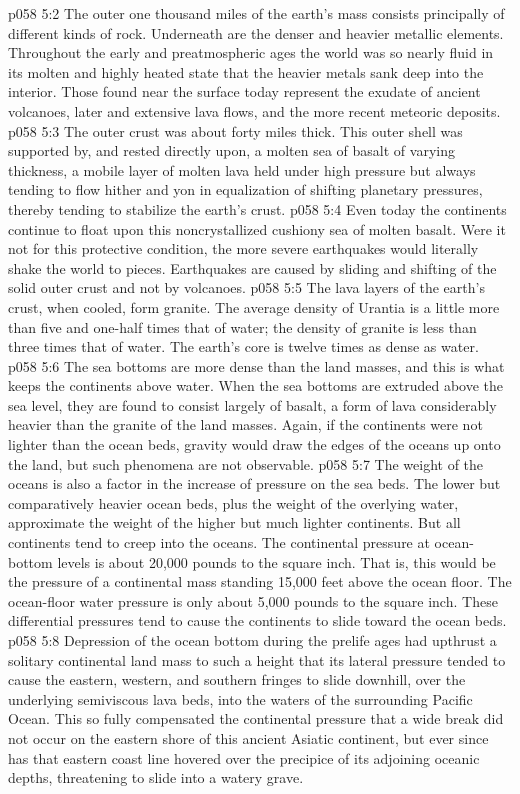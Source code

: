\vs p058 5:2 The outer one thousand miles of the earth’s mass consists principally of different kinds of rock. Underneath are the denser and heavier metallic elements. Throughout the early and preatmospheric ages the world was so nearly fluid in its molten and highly heated state that the heavier metals sank deep into the interior. Those found near the surface today represent the exudate of ancient volcanoes, later and extensive lava flows, and the more recent meteoric deposits.
\vs p058 5:3 The outer crust was about forty miles thick. This outer shell was supported by, and rested directly upon, a molten sea of basalt of varying thickness, a mobile layer of molten lava held under high pressure but always tending to flow hither and yon in equalization of shifting planetary pressures, thereby tending to stabilize the earth’s crust.
\vs p058 5:4 Even today the continents continue to float upon this noncrystallized cushiony sea of molten basalt. Were it not for this protective condition, the more severe earthquakes would literally shake the world to pieces. Earthquakes are caused by sliding and shifting of the solid outer crust and not by volcanoes.
\pc \vs p058 5:5 The lava layers of the earth’s crust, when cooled, form granite. The average density of Urantia is a little more than five and one\hyp{}half times that of water; the density of granite is less than three times that of water. The earth’s core is twelve times as dense as water.
\vs p058 5:6 The sea bottoms are more dense than the land masses, and this is what keeps the continents above water. When the sea bottoms are extruded above the sea level, they are found to consist largely of basalt, a form of lava considerably heavier than the granite of the land masses. Again, if the continents were not lighter than the ocean beds, gravity would draw the edges of the oceans up onto the land, but such phenomena are not observable.
\vs p058 5:7 The weight of the oceans is also a factor in the increase of pressure on the sea beds. The lower but comparatively heavier ocean beds, plus the weight of the overlying water, approximate the weight of the higher but much lighter continents. But all continents tend to creep into the oceans. The continental pressure at ocean\hyp{}bottom levels is about 20,000 pounds to the square inch. That is, this would be the pressure of a continental mass standing 15,000 feet above the ocean floor. The ocean\hyp{}floor water pressure is only about 5,000 pounds to the square inch. These differential pressures tend to cause the continents to slide toward the ocean beds.
\vs p058 5:8 Depression of the ocean bottom during the prelife ages had upthrust a solitary continental land mass to such a height that its lateral pressure tended to cause the eastern, western, and southern fringes to slide downhill, over the underlying semiviscous lava beds, into the waters of the surrounding Pacific Ocean. This so fully compensated the continental pressure that a wide break did not occur on the eastern shore of this ancient Asiatic continent, but ever since has that eastern coast line hovered over the precipice of its adjoining oceanic depths, threatening to slide into a watery grave.
